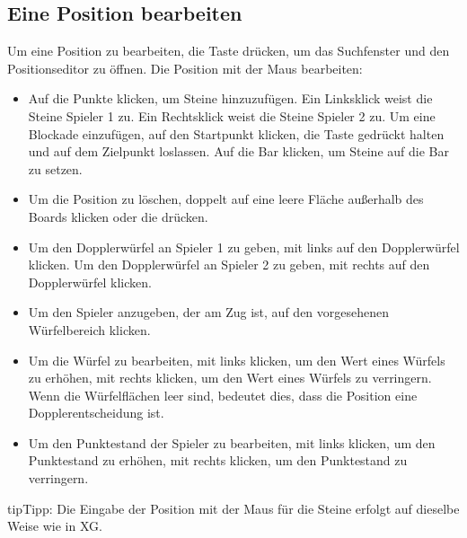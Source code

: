 \documentclass[letterpaper,10pt,german]{sphinxmanual}
\begin{document}
\subsection{Eine Position bearbeiten}
\label{\detokenize{guide_utilisateur:editer-une-position}}\label{\detokenize{guide_utilisateur:guide-edit-position}}
\sphinxAtStartPar
Um eine Position zu bearbeiten, die Taste  drücken, um das Suchfenster und den Positionseditor zu öffnen. Die Position mit der Maus bearbeiten:
\begin{itemize}
\item {} 
\sphinxAtStartPar
Auf die Punkte klicken, um Steine hinzuzufügen. Ein Linksklick weist die Steine Spieler 1 zu. Ein Rechtsklick weist die Steine Spieler 2 zu. Um eine Blockade einzufügen, auf den Startpunkt klicken, die Taste gedrückt halten und auf dem Zielpunkt loslassen. Auf die Bar klicken, um Steine auf die Bar zu setzen.

\item {} 
\sphinxAtStartPar
Um die Position zu löschen, doppelt auf eine leere Fläche außerhalb des Boards klicken oder die  drücken.

\item {} 
\sphinxAtStartPar
Um den Dopplerwürfel an Spieler 1 zu geben, mit links auf den Dopplerwürfel klicken. Um den Dopplerwürfel an Spieler 2 zu geben, mit rechts auf den Dopplerwürfel klicken.

\item {} 
\sphinxAtStartPar
Um den Spieler anzugeben, der am Zug ist, auf den vorgesehenen Würfelbereich klicken.

\item {} 
\sphinxAtStartPar
Um die Würfel zu bearbeiten, mit links klicken, um den Wert eines Würfels zu erhöhen, mit rechts klicken, um den Wert eines Würfels zu verringern. Wenn die Würfelflächen leer sind, bedeutet dies, dass die Position eine Dopplerentscheidung ist.

\item {} 
\sphinxAtStartPar
Um den Punktestand der Spieler zu bearbeiten, mit links klicken, um den Punktestand zu erhöhen, mit rechts klicken, um den Punktestand zu verringern.

\end{itemize}

\begin{sphinxadmonition}{tip}{Tipp:}
\sphinxAtStartPar
Die Eingabe der Position mit der Maus für die Steine erfolgt auf dieselbe Weise wie in XG.
\end{sphinxadmonition}
\end{document}
